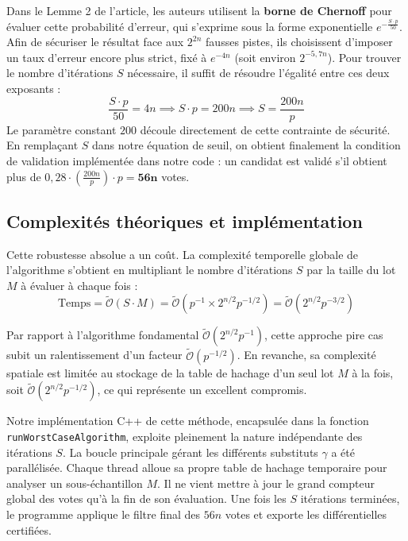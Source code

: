 \documentclass[a4paper,11pt]{article}
\begin{document}
Dans le Lemme 2 de l'article, les auteurs utilisent la \textbf{borne de Chernoff} \cite{MU17} pour évaluer cette probabilité d'erreur, qui s'exprime sous la forme exponentielle $e^{-\frac{S \cdot p}{50}}$.
Afin de sécuriser le résultat face aux $2^{2n}$ fausses pistes, ils choisissent d'imposer un taux d'erreur encore plus strict, fixé à $e^{-4n}$ (soit environ $2^{-5,7n}$). Pour trouver le nombre d'itérations $S$ nécessaire, il suffit de résoudre l'égalité entre ces deux exposants :
\begin{equation*}
    \frac{S \cdot p}{50} = 4n \implies S \cdot p = 200n \implies S = \frac{200n}{p}
\end{equation*}
Le paramètre constant $200$ découle directement de cette contrainte de sécurité. En remplaçant $S$ dans notre équation de seuil, on obtient finalement la condition de validation implémentée dans notre code : un candidat est validé s'il obtient plus de $0,28 \cdot \left(\frac{200n}{p}\right) \cdot p = \mathbf{56n}$ votes.

\subsection{Complexités théoriques et implémentation}

Cette robustesse absolue a un coût. La complexité temporelle globale de l'algorithme s'obtient en multipliant le nombre d'itérations $S$ par la taille du lot $M$ à évaluer à chaque fois :
\begin{equation*}
    \text{Temps} = \tilde{\mathcal{O}}(S \cdot M) = \tilde{\mathcal{O}}\left(p^{-1} \times 2^{n/2} p^{-1/2}\right) = \tilde{\mathcal{O}}(2^{n/2} p^{-3/2})
\end{equation*}

Par rapport à l'algorithme fondamental $\tilde{\mathcal{O}}(2^{n/2} p^{-1})$, cette approche pire cas subit un ralentissement d'un facteur $\tilde{\mathcal{O}}(p^{-1/2})$. En revanche, sa complexité spatiale est limitée au stockage de la table de hachage d'un seul lot $M$ à la fois, soit $\tilde{\mathcal{O}}(2^{n/2} p^{-1/2})$, ce qui représente un excellent compromis.

Notre implémentation C++ de cette méthode, encapsulée dans la fonction \texttt{run\allowbreak Worst\allowbreak Case\allowbreak Algorithm}, exploite pleinement la nature indépendante des itérations $S$. La boucle principale gérant les différents substituts $\gamma$ a été parallélisée. Chaque thread alloue sa propre table de hachage temporaire pour analyser un sous-échantillon $M$. Il ne vient mettre à jour le grand compteur global des votes qu'à la fin de son évaluation. Une fois les $S$ itérations terminées, le programme applique le filtre final des $56n$ votes et exporte les différentielles certifiées.
\end{document}
